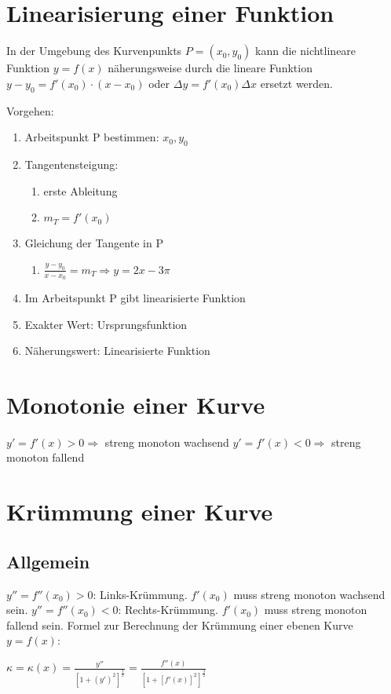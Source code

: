 \documentclass[a4paper,DIV10,12pt,headsepline,smallheadings,halfparskip-]{scrreprt}
\begin{document}
	\section{Linearisierung einer Funktion}
	In der Umgebung des Kurvenpunkts \(P=(x_0,y_0)\) kann die nichtlineare Funktion \(y=f(x)\) näherungsweise durch die lineare Funktion\newline
	\(y - y_0 = f'(x_0) \cdot (x - x_0) \) oder \( \Delta y = f'(x_0)\Delta x \)\newline
	ersetzt werden.
	
	\par Vorgehen: 
	\begin{enumerate}
		\item Arbeitspunkt P bestimmen: \(x_0, y_0\)
		\item Tangentensteigung:
		\begin{enumerate}
			\item erste Ableitung
			\item \(m_T = f'(x_0)\)
		\end{enumerate}
		\item Gleichung der Tangente in P
		\begin{enumerate}
			\item \(\frac{y-y_0}{x-x_0} = m_T  \Rightarrow y = 2x-3\pi  \)
		\end{enumerate}
		\item Im Arbeitspunkt P gibt linearisierte Funktion
		\item Exakter Wert: Ursprungsfunktion
		\item Näherungswert: Linearisierte Funktion
	\end{enumerate}

	\section{Monotonie einer Kurve} %
	\label{sec:monotonie_einer_kurve}
	\( y' = f'(x) > 0 \Rightarrow \) streng monoton wachsend\newline
	\( y' = f'(x) < 0 \Rightarrow \) streng monoton fallend

	\section{Krümmung einer Kurve} %
	\label{sec:krümmung_einer_kurve}
	\subsection{Allgemein} %
	\label{sub:allgemein}
	\( y'' = f''(x_0) > 0 \): Links-Krümmung. \( f'(x_0) \) muss streng monoton wachsend sein. \newline
	\( y'' = f''(x_0) < 0 \): Rechts-Krümmung. \( f'(x_0) \) muss streng monoton fallend sein. \newline
	Formel zur Berechnung der Krümmung einer ebenen Kurve \(y=f(x)\):\par
	\( \kappa = \kappa (x) = \frac{y''}{[1+(y')^2]^{\frac{3}{2}}} = \frac{f''(x)}{[1+[f'(x)]^2]^{\frac{3}{2}}} \)
\end{document}
